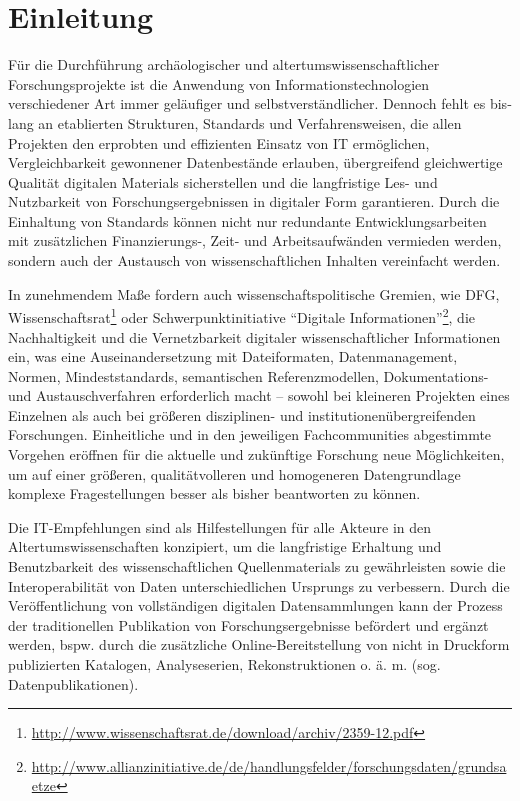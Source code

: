 
\chapter{Einleitung}

Für die Durchführung archäologischer und altertumswissenschaftlicher Forschungsprojekte ist die Anwendung von Informationstechnologien verschiedener Art immer geläufiger und selbstverständlicher. Dennoch fehlt es bis­lang an etablierten Strukturen, Standards und Verfahrensweisen, die allen Projekten den erprobten und effizienten Einsatz von IT ermöglichen, Vergleichbarkeit gewonnener Datenbestände erlauben, übergreifend gleichwertige Qualität digitalen Materials sicherstellen und die langfristige Les- und Nutzbarkeit von Forschungsergebnissen in digitaler Form garantieren. Durch die Einhaltung von Standards können nicht nur redundante Entwicklungsarbeiten mit zusätzlichen Finanzierungs-, Zeit- und Arbeitsaufwänden vermieden werden, sondern auch der Austausch von wissenschaftlichen Inhalten vereinfacht werden.

In zunehmendem Maße fordern auch wissenschaftspolitische Gremien, wie DFG, Wissenschaftsrat\footnote{\url{http://www.wissenschaftsrat.de/download/archiv/2359-12.pdf}} oder Schwerpunktinitiative "`Digitale Informationen"'\footnote{\url{http://www.allianzinitiative.de/de/handlungsfelder/forschungsdaten/grundsaetze}}, die Nachhaltigkeit und die Vernetzbarkeit digitaler wissenschaftlicher Informationen ein, was eine Auseinandersetzung mit Dateiformaten, Datenmanagement, Normen, Mindeststandards, semantischen Referenzmodellen, Dokumentations- und Austauschverfahren erforderlich macht -- sowohl bei kleineren Projekten eines Einzelnen als auch bei größeren disziplinen- und institutionenübergreifenden Forschungen. Einheitliche und in den jeweiligen Fachcommunities abgestimmte Vorgehen eröffnen für die aktuelle und zukünftige Forschung neue Möglichkeiten, um auf einer größeren, qualitätvolleren und homogeneren Datengrundlage komplexe Fragestellungen besser als bisher beantworten zu können.

Die IT-Empfehlungen sind als Hilfestellungen für alle Akteure in den Altertumswissenschaften konzipiert, um die langfristige Erhaltung und Benutzbarkeit des wissenschaftlichen Quellenmaterials zu gewährleisten sowie die Interoperabilität von Daten unterschiedlichen Ursprungs zu verbessern. Durch die Veröffentlichung von vollständigen digitalen Datensammlungen kann der Prozess der traditionellen Publikation von Forschungsergebnisse befördert und ergänzt werden, bspw. durch die zusätzliche Online-Bereitstellung von nicht in Druckform publizierten Katalogen, Analyseserien, Rekonstruktionen o. ä. m. (sog. Datenpublikationen).

